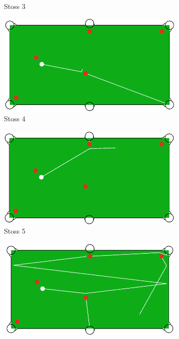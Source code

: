 \begin{figure}
\begin{subfigure}[b]{0.3\textwidth}
        \caption{Stoss 3}
        \label{fig:situation_1_solution_3}
    \end{subfigure}
    \begin{subfigure}[b]{0.3\textwidth}
        \centering
        \includegraphics[width=1.0\linewidth]{../common/04_results/resources/simple_search/situation_diverse_solution_4.PNG}
        \caption{Stoss 4}
        \label{fig:situation_1_solution_4}
    \end{subfigure}
    \hfill
    \begin{subfigure}[b]{0.3\textwidth}
        \centering
        \includegraphics[width=1.0\linewidth]{../common/04_results/resources/simple_search/situation_diverse_solution_5.PNG}
        \caption{Stoss 5}
        \label{fig:situation_1_solution_5}
    \end{subfigure}
    \hfill
    \begin{subfigure}[b]{0.3\textwidth}
        \centering
        \includegraphics[width=1.0\linewidth]{../common/04_results/resources/simple_search/situation_diverse_solution_6.PNG}

\end{subfigure}
\end{figure}
